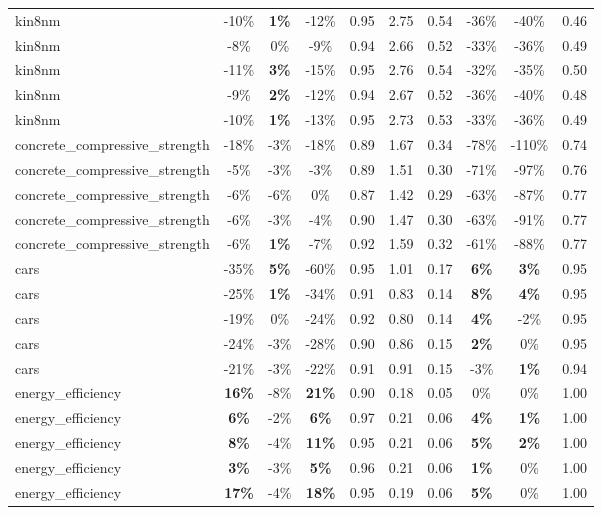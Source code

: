 \begin{table}[!htbp]
\begin{small}
\begin{sc}
{\begin{tabular}{lccccccccc}
kin8nm & -10\% & \textbf{1\%} & -12\% & 0.95 & 2.75 & 0.54 & -36\% & -40\% & 0.46 \\
kin8nm & -8\% & 0\% & -9\% & 0.94 & 2.66 & 0.52 & -33\% & -36\% & 0.49 \\
kin8nm & -11\% & \textbf{3\%} & -15\% & 0.95 & 2.76 & 0.54 & -32\% & -35\% & 0.50 \\
kin8nm & -9\% & \textbf{2\%} & -12\% & 0.94 & 2.67 & 0.52 & -36\% & -40\% & 0.48 \\
kin8nm & -10\% & \textbf{1\%} & -13\% & 0.95 & 2.73 & 0.53 & -33\% & -36\% & 0.49 \\
concrete\_compressive\_strength & -18\% & -3\% & -18\% & 0.89 & 1.67 & 0.34 & -78\% & -110\% & 0.74 \\
concrete\_compressive\_strength & -5\% & -3\% & -3\% & 0.89 & 1.51 & 0.30 & -71\% & -97\% & 0.76 \\
concrete\_compressive\_strength & -6\% & -6\% & 0\% & 0.87 & 1.42 & 0.29 & -63\% & -87\% & 0.77 \\
concrete\_compressive\_strength & -6\% & -3\% & -4\% & 0.90 & 1.47 & 0.30 & -63\% & -91\% & 0.77 \\
concrete\_compressive\_strength & -6\% & \textbf{1\%} & -7\% & 0.92 & 1.59 & 0.32 & -61\% & -88\% & 0.77 \\
cars & -35\% & \textbf{5\%} & -60\% & 0.95 & 1.01 & 0.17 & \textbf{6\%} & \textbf{3\%} & 0.95 \\
cars & -25\% & \textbf{1\%} & -34\% & 0.91 & 0.83 & 0.14 & \textbf{8\%} & \textbf{4\%} & 0.95 \\
cars & -19\% & 0\% & -24\% & 0.92 & 0.80 & 0.14 & \textbf{4\%} & -2\% & 0.95 \\
cars & -24\% & -3\% & -28\% & 0.90 & 0.86 & 0.15 & \textbf{2\%} & 0\% & 0.95 \\
cars & -21\% & -3\% & -22\% & 0.91 & 0.91 & 0.15 & -3\% & \textbf{1\%} & 0.94 \\
energy\_efficiency & \textbf{16\%} & -8\% & \textbf{21\%} & 0.90 & 0.18 & 0.05 & 0\% & 0\% & 1.00 \\
energy\_efficiency & \textbf{6\%} & -2\% & \textbf{6\%} & 0.97 & 0.21 & 0.06 & \textbf{4\%} & \textbf{1\%} & 1.00 \\
energy\_efficiency & \textbf{8\%} & -4\% & \textbf{11\%} & 0.95 & 0.21 & 0.06 & \textbf{5\%} & \textbf{2\%} & 1.00 \\
energy\_efficiency & \textbf{3\%} & -3\% & \textbf{5\%} & 0.96 & 0.21 & 0.06 & \textbf{1\%} & 0\% & 1.00 \\
energy\_efficiency & \textbf{17\%} & -4\% & \textbf{18\%} & 0.95 & 0.19 & 0.06 & \textbf{5\%} & 0\% & 1.00 \\

\end{tabular}}
\end{sc}
\end{small}
\end{table}
